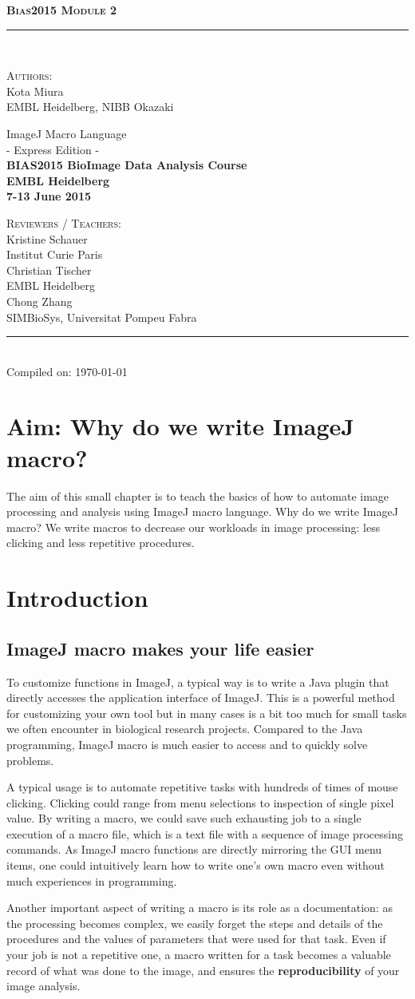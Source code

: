 \documentclass[11pt,a4paper,oneside]{report}
\newcommand{\HRule}{\rule{\linewidth}{0.5mm}}
\newcommand*{\titleTH}{\begingroup
\raggedleft
\textsc{\textbf{\Large{Bias2015 \hfill Module 2}}}
\HRule\\
\vspace*{\baselineskip}

\hfill \textsc{\large Authors:}\\
[0.3\baselineskip]
\hfill {\Large Kota Miura}\\
{\small EMBL Heidelberg, NIBB Okazaki}\\
\vfill

{\textcolor{Medium}{\Huge ImageJ Macro Language}}\\
[\baselineskip]
{\Large - Express Edition -}\\
[2\baselineskip]

{\bfseries BIAS2015 BioImage Data Analysis Course}\\
\textbf{EMBL Heidelberg}\\
\textbf{7-13 June 2015}

\vfill

\hfill \textsc{Reviewers / Teachers:}\\
[0.3\baselineskip]
\hfill {\large Kristine Schauer}\\
\hfill {\small Institut Curie Paris}\\
[0.3\baselineskip]
\hfill {\large Christian Tischer}\\
\hfill {\small EMBL Heidelberg}\\
[0.3\baselineskip]
\hfill {\large Chong Zhang}\\
\hfill {\small SIMBioSys, Universitat Pompeu Fabra}\\
\HRule\\

{\small \hfill\textcolor{Medium}{ Compiled on: \today }}
\endgroup}
\begin{document}
\date{\today}

\pagestyle{empty}
\titleTH
\clearpage
\pagestyle{fancyplain}

\begingroup
\hypersetup{linkcolor=black}
\tableofcontents
\endgroup

\clearpage

\setcounter{chapter}{2}


\section{Aim: Why do we write ImageJ macro?}
  
The aim of this small chapter is to teach the basics of how to automate image processing and analysis using ImageJ macro language. Why do we write ImageJ macro? We write macros to decrease our workloads in image processing: less clicking and less repetitive procedures. 
   
\section{Introduction}
  

\subsection{ImageJ macro makes your life easier}

To customize functions in ImageJ, a typical way is to write a Java plugin that directly accesses the application interface of ImageJ. 
This is a powerful method for customizing your own tool but in many cases is a bit too much for small tasks we often encounter in biological research projects. Compared to the Java programming, ImageJ macro is much easier to access and to quickly solve problems.

A typical usage is to automate repetitive tasks with hundreds of times of mouse clicking. Clicking could range from menu selections to inspection of single pixel value. By writing a macro, we could save such exhausting job to a single execution of a macro file, which is a text file with a sequence of image processing commands. As ImageJ macro functions are directly mirroring the GUI menu items, one could intuitively learn how to write one's own macro even without much experiences in programming.

Another important aspect of writing a macro is its role as a documentation: as the processing becomes complex, we easily forget the steps and details of the procedures and the values of parameters that were used for that task. Even if your job is not a repetitive one, a macro written for a task becomes a valuable record of what was done to the image, and ensures the \textbf{reproducibility} of your image analysis.  
\end{document}

